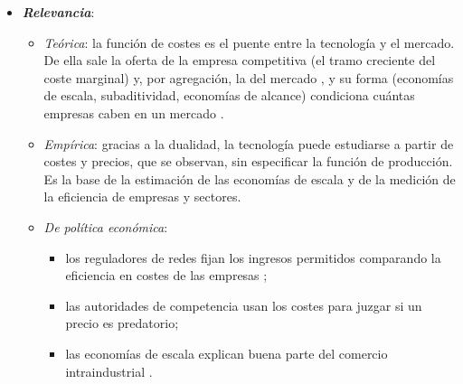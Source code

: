 \documentclass[11pt]{article}
\begin{document}
\begin{itemize}
\item \textbf{\emph{Relevancia}}:
  \begin{itemize}
  \item \emph{Teórica}: la función de costes es el puente entre la tecnología y el mercado. De ella sale la oferta de la empresa competitiva (el tramo creciente del coste marginal) y, por agregación, la del mercado , y su forma (economías de escala, subaditividad, economías de alcance) condiciona cuántas empresas caben en un mercado .
  \item \emph{Empírica}: gracias a la dualidad, la tecnología puede estudiarse a partir de costes y precios, que se observan, sin especificar la función de producción. Es la base de la estimación de las economías de escala y de la medición de la eficiencia de empresas y sectores.
  \item \emph{De política económica}:
    \begin{itemize}
    \item los reguladores de redes fijan los ingresos permitidos comparando la eficiencia en costes de las empresas  ;
    \item las autoridades de competencia usan los costes para juzgar si un precio es predatorio\nocite{AreedaTurner1975Predatory};
    \item las economías de escala explican buena parte del comercio intraindustrial .
    \end{itemize}
  \end{itemize}


\end{itemize}
\end{document}
